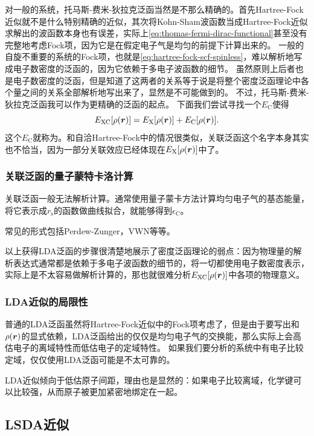对一般的系统，托马斯-费米-狄拉克泛函当然是不那么精确的。首先Hartree-Fock近似就不是什么特别精确的近似，其次将Kohn-Sham波函数当成Hartree-Fock近似求解出的波函数本身也有误差，实际上\eqref{eq:thomas-fermi-dirac-functional}甚至没有完整地考虑Fock项，因为它是在假定电子气是均匀的前提下计算出来的。
一般的自旋不重要的系统的Fock项，也就是\eqref{eq:hartree-fock-scf-spinless}，难以解析地写成电子数密度的泛函的，因为它依赖于多电子波函数的细节。
虽然原则上后者也是电子数密度的泛函，但是知道了这两者的关系等于说是将整个密度泛函理论中各个量之间的关系全部解析地写出来了，显然是不可能做到的。
不过，托马斯-费米-狄拉克泛函我可以作为更精确的泛函的起点。
下面我们尝试寻找一个$E_\text{C}$使得
\begin{equation}
    E_\text{XC}[\rho(\vb*{r})] = E_\text{X}[\rho(\vb*{r})] + E_\text{C}[\rho(\vb*{r})].
\end{equation}
这个$E_\text{C}$就称为。和自洽Hartree-Fock中的情况很类似，关联泛函这个名字本身其实也不恰当，因为一部分关联效应已经体现在$E_\text{X}[\rho(\vb*{r})]$中了。

\subsubsection{关联泛函的量子蒙特卡洛计算}

关联泛函一般无法解析计算。通常使用量子蒙卡方法计算均匀电子气的基态能量，将它表示成$r_\text{s}$的函数做曲线拟合，就能够得到$\epsilon_\text{C}$。

常见的形式包括Perdew-Zunger，VWN等等。

以上获得LDA泛函的步骤很清楚地展示了密度泛函理论的弱点：因为物理量的解析表达式通常都是依赖于多电子波函数的细节的，将一切都使用电子数密度表示，实际上是不太容易做解析计算的，那也就很难分析$E_\text{XC}[\rho(\vb*{r})]$中各项的物理意义。

\subsubsection{LDA近似的局限性}

普通的LDA泛函虽然将Hartree-Fock近似中的Fock项考虑了，但是由于要写出和$\rho(\vb*{r})$的显式依赖，LDA泛函给出的仅仅是均匀电子气的交换能，那么实际上会高估电子的离域特性而低估电子的定域特性。
如果我们要分析的系统中有电子比较定域，仅仅使用LDA泛函可能是不太可靠的。

LDA近似倾向于低估原子间距，理由也是显然的：如果电子比较离域，化学键可以比较强，从而原子被更加紧密地绑定在一起。

\subsection{LSDA近似}

